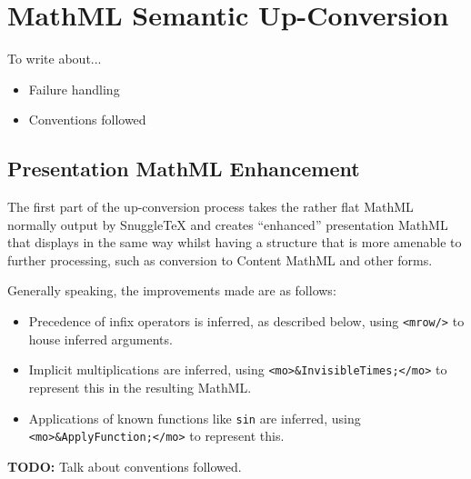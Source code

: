 
\section*{MathML Semantic Up-Conversion}

To write about...

\begin{itemize}
\item Failure handling
\item Conventions followed
\end{itemize}

\subsection*{Presentation MathML Enhancement}

The first part of the up-conversion process takes the rather flat MathML normally
output by SnuggleTeX and creates ``enhanced'' presentation MathML that displays in the
same way whilst having a structure that is more amenable to further processing,
such as conversion to Content MathML and other forms.

Generally speaking, the improvements made are as follows:

\begin{itemize}
\item Precedence of infix operators is inferred, as described below, using
\verb|<mrow/>| to house inferred arguments.
\item Implicit multiplications are inferred, using \verb|<mo>&InvisibleTimes;</mo>|
to represent this in the resulting MathML.
\item Applications of known functions like \verb|sin| are inferred, using
\verb|<mo>&ApplyFunction;</mo>| to represent this.
\end{itemize}

\textbf{TODO:} Talk about conventions followed.

